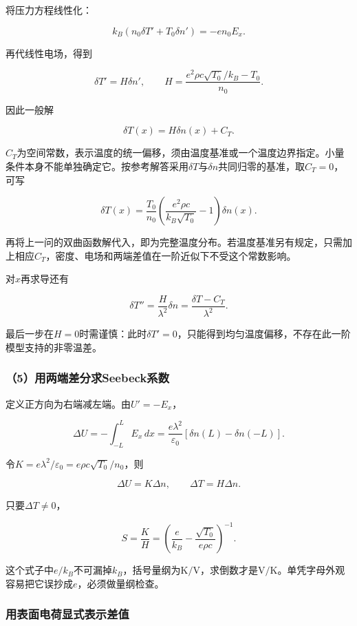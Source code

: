 \documentclass[12pt,a4paper,fontset=fandol]{ctexart}
\begin{document}
将压力方程线性化：

\[
k_B(n_0\delta T'+T_0\delta n')
=-en_0E_x.
\]

再代线性电场，得到

\[
\delta T'=H\delta n',
\qquad
H=\frac{e^2\rho c\sqrt{T_0}/k_B-T_0}{n_0}.
\]

因此一般解

\[
\boxed{\delta T(x)=H\delta n(x)+C_T}.
\]

\(C_T\)为空间常数，表示温度的统一偏移，须由温度基准或一个温度边界指定。小量条件本身不能单独确定它。按参考解答采用\(\delta T\)与\(\delta n\)共同归零的基准，取\(C_T=0\)，可写

\[
\boxed{
\delta T(x)=
\frac{T_0}{n_0}
\left(\frac{e^2\rho c}{k_B\sqrt{T_0}}-1\right)\delta n(x)}.
\]

再将上一问的双曲函数解代入，即为完整温度分布。若温度基准另有规定，只需加上相应\(C_T\)，密度、电场和两端差值在一阶近似下不受这个常数影响。

对\(x\)再求导还有

\[
\delta T''=\frac{H}{\lambda^2}\delta n
=\frac{\delta T-C_T}{\lambda^2}.
\]

最后一步在\(H=0\)时需谨慎：此时\(\delta T'=0\)，只能得到均匀温度偏移，不存在此一阶模型支持的非零温差。

\subsubsection{（5）用两端差分求Seebeck系数}\label{ux7528ux4e24ux7aefux5deeux5206ux6c42seebeckux7cfbux6570}

定义正方向为右端减左端。由\(U'=-E_x\)，

\[
\Delta U=-\int_{-L}^LE_x\,dx
=\frac{e\lambda^2}{\varepsilon_0}
[\delta n(L)-\delta n(-L)].
\]

令\(K=e\lambda^2/\varepsilon_0=e\rho c\sqrt{T_0}/n_0\)，则

\[
\Delta U=K\Delta n,\qquad
\Delta T=H\Delta n.
\]

只要\(\Delta T\neq0\)，

\[
\boxed{
S=\frac KH
=\left(\frac e{k_B}-\frac{\sqrt{T_0}}{e\rho c}\right)^{-1}}.
\]

这个式子中\(e/k_B\)不可漏掉\(k_B\)，括号量纲为\(\mathrm{K/V}\)，求倒数才是\(\mathrm{V/K}\)。单凭字母外观容易把它误抄成\(e\)，必须做量纲检查。

\subsubsection{用表面电荷显式表示差值}\label{ux7528ux8868ux9762ux7535ux8377ux663eux5f0fux8868ux793aux5deeux503c}
\end{document}
